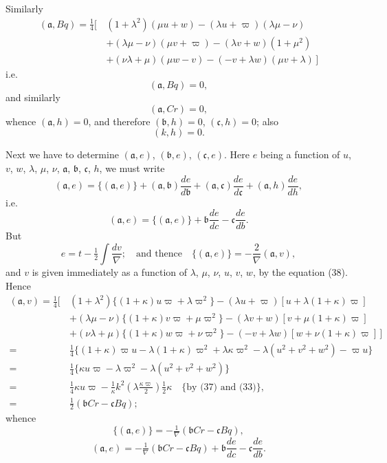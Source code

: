 \documentclass[11pt]{article}
\begin{document}
\newpage
\setcounter{page}{246}

Similarly
\begin{align*}
(\mathfrak{a}, Bq) = \tfrac{1}{4}\big[\, & (1 + \lambda^2)(\mu u + w) - (\lambda u + \varpi)(\lambda\mu - \nu) \\
& + (\lambda\mu - \nu)(\mu v + \varpi) - (\lambda v + w)(1 + \mu^2) \\
& + (\nu\lambda + \mu)(\mu w - v) - (-v + \lambda w)(\mu v + \lambda)\,\big]
\end{align*}
i.e.
\[
(\mathfrak{a}, Bq) = 0, \tag{43}
\]
and similarly
\[
(\mathfrak{a}, Cr) = 0, \tag{44}
\]
whence $(\mathfrak{a}, h) = 0$, and therefore $(\mathfrak{b}, h) = 0$, $(\mathfrak{c}, h) = 0$;
also
\[
(k, h) = 0. \tag{45}
\]

Next we have to determine $(\mathfrak{a}, e)$, $(\mathfrak{b}, e)$, $(\mathfrak{c}, e)$. Here $e$ being a function of $u$, $v$, $w$, $\lambda$, $\mu$, $\nu$, $\mathfrak{a}$, $\mathfrak{b}$, $\mathfrak{c}$, $h$, we must write
\[
(\mathfrak{a}, e) = \{(\mathfrak{a}, e)\} + (\mathfrak{a}, \mathfrak{b})\frac{de}{d\mathfrak{b}} + (\mathfrak{a}, \mathfrak{c})\frac{de}{d\mathfrak{c}} + (\mathfrak{a}, h)\frac{de}{dh},
\]
i.e.
\[
(\mathfrak{a}, e) = \{(\mathfrak{a}, e)\} + \mathfrak{b}\frac{de}{dc} - \mathfrak{c}\frac{de}{db}.
\]
But
\[
e = t - \tfrac{1}{2}\!\int\!\frac{dv}{\nabla};\quad \text{and thence}\quad \{(\mathfrak{a}, e)\} = -\frac{2}{\nabla}(\mathfrak{a}, v),
\]
and $v$ is given immediately as a function of $\lambda$, $\mu$, $\nu$, $u$, $v$, $w$, by the equation (38). Hence
\begin{align*}
(\mathfrak{a}, v) = \tfrac{1}{4}\big[\, & (1 + \lambda^2)\{(1 + \kappa)u\varpi + \lambda\varpi^2\} - (\lambda u + \varpi)[u + \lambda(1 + \kappa)\varpi] \\
& + (\lambda\mu - \nu)\{(1 + \kappa)v\varpi + \mu\varpi^2\} - (\lambda v + w)[v + \mu(1 + \kappa)\varpi] \\
& + (\nu\lambda + \mu)\{(1 + \kappa)w\varpi + \nu\varpi^2\} - (-v + \lambda w)[w + \nu(1 + \kappa)\varpi]\,\big] \\
= {}&\tfrac{1}{4}\{(1 + \kappa)\varpi u - \lambda(1 + \kappa)\varpi^2 + \lambda\kappa\varpi^2 - \lambda(u^2 + v^2 + w^2) - \varpi u\} \\
= {}&\tfrac{1}{4}\{\kappa u\varpi - \lambda\varpi^2 - \lambda(u^2 + v^2 + w^2)\} \\
= {}&\tfrac{1}{4}\kappa u\varpi - \tfrac{1}{\kappa}k^2\left(\lambda\frac{\kappa\varpi}{2}\right)\tfrac{1}{2}\kappa \quad \{\text{by (37) and (33)}\}, \\
= {}&\tfrac{1}{2}(\mathfrak{b}Cr - \mathfrak{c}Bq); \tag{46}
\end{align*}
whence
\[
\{(\mathfrak{a}, e)\} = -\tfrac{1}{\nabla}(\mathfrak{b}Cr - \mathfrak{c}Bq),
\]
\[
(\mathfrak{a}, e) = -\tfrac{1}{\nabla}(\mathfrak{b}Cr - \mathfrak{c}Bq) + \mathfrak{b}\frac{de}{dc} - \mathfrak{c}\frac{de}{db}.
\]
\end{document}
